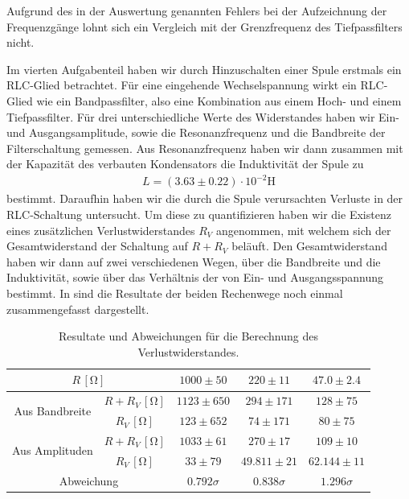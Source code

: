 Aufgrund des in der Auswertung genannten Fehlers bei der Aufzeichnung der Frequenzgänge lohnt sich ein Vergleich mit der Grenzfrequenz des Tiefpassfilters nicht.

Im vierten Aufgabenteil haben wir durch Hinzuschalten einer Spule erstmals ein RLC-Glied betrachtet. Für eine eingehende Wechselspannung wirkt ein RLC-Glied wie ein Bandpassfilter, also eine Kombination aus einem Hoch- und einem Tiefpassfilter. Für drei unterschiedliche Werte des Widerstandes haben wir Ein- und Ausgangsamplitude, sowie die Resonanzfrequenz und die Bandbreite der Filterschaltung gemessen. Aus Resonanzfrequenz haben wir dann zusammen mit der Kapazität des verbauten Kondensators die Induktivität der Spule zu
\begin{align*}
  L = (3.63 \pm 0.22) \cdot 10^{-2}\si{\henry}
\end{align*}
bestimmt. Daraufhin haben wir die durch die Spule verursachten Verluste in der RLC-Schaltung untersucht. Um diese zu quantifizieren haben wir die Existenz eines zusätzlichen Verlustwiderstandes $R_V$ angenommen, mit welchem sich der Gesamtwiderstand der Schaltung auf $R + R_V$ beläuft. Den Gesamtwiderstand haben wir dann auf zwei verschiedenen Wegen, über die Bandbreite und die Induktivität, sowie über das Verhältnis der von Ein- und Ausgangsspannung bestimmt. In  sind die Resultate der beiden Rechenwege noch einmal zusammengefasst dargestellt.

\renewcommand{\arraystretch}{1.5}
\begin{table}[H]
  \centering
  \caption{Resultate und Abweichungen für die Berechnung des Verlustwiderstandes.}
  \vspace*{1em}
  \begin{tabular}{|c|c|c|c|c|}
    \hline
    \multicolumn{2}{|c|}{$R\,[\si{\ohm}]$} & $1000 \pm 50$ & $220 \pm 11$ & $47.0 \pm 2.4$ \\
    \hline
    \hline
    \multirow{2}{*}{Aus Bandbreite} & $R + R_V\,[\si{\ohm}]$ & $1123 \pm 650$ & $294 \pm 171$ & $128 \pm 75$ \\
    \cline{2-5}
    & $R_V\,[\si{\ohm}]$ & $123 \pm 652$ & $74 \pm 171$ & $80 \pm 75$ \\
    \hline
    \hline
    \multirow{2}{*}{Aus Amplituden} & $R + R_V\,[\si{\ohm}]$  & $1033 \pm 61$ & $270 \pm 17$ & $109 \pm 10$ \\
    \cline{2-5}
    & $R_V\,[\si{\ohm}]$ & $33 \pm 79$ & $49.811 \pm 21$ & $62.144 \pm 11$ \\
    \hline\hline
    \multicolumn{2}{|c|}{Abweichung} & $0.792\sigma$ & $0.838\sigma$ & $1.296\sigma$ \\\hline
  \end{tabular}
  \label{tab:zsmf_verlustwiderstand}
\end{table}
\renewcommand{\arraystretch}{1}

